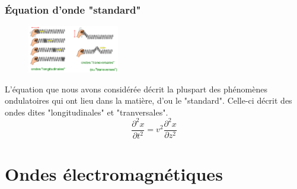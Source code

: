 \documentclass	[11pt, a4paper, openany]{book}
\begin{document}
		\subsubsection{Équation d'onde "standard"}
		\begin{figure}
			\includegraphics[width=4cm]{oo/image31.png}
		\end{figure}
		L'équation que nous avons considérée décrit la pluspart des phénomènes ondulatoires qui ont lieu dans la matière, d'ou le "standard". Celle-ci décrit des ondes dites "longitudinales" et "tranversales".
		\begin{equation}
			\frac{\partial^2 x}{\partial t^2} = v^2 \frac{\partial^2 x}{\partial z^2}
		\end{equation}
		
		\section{Ondes électromagnétiques}
\end{document}

